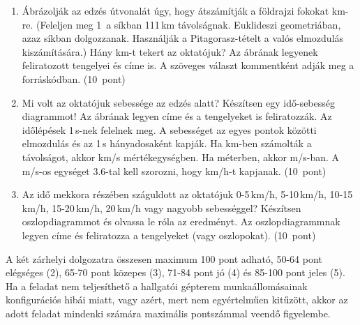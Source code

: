 \documentclass[a4paper,12pt]{letter}
\begin{document}
\begin{enumerate}
\begin{enumerate}
\item Ábrázolják az edzés útvonalát úgy, hogy átszámítják a földrajzi fokokat km-re. (Feleljen meg 1\textdegree\ a síkban 111\,km távolságnak. Euklideszi geometriában, azaz síkban dolgozzanak. Használják a Pitagorasz-tételt a valós elmozdulás kiszámítására.) Hány km-t tekert az oktatójuk? Az ábrának legyenek feliratozott tengelyei és címe is. A szöveges választ kommentként adják meg a forráskódban. \hfill (10~pont)
\item Mi volt az oktatójuk sebessége az edzés alatt? Készítsen egy idő-sebesség diagrammot! Az ábrának legyen címe és a tengelyeket is feliratozzák. Az időlépések 1\,s-nek felelnek meg. A sebességet az egyes pontok közötti elmozdulás és az 1\,s hányadosaként kapják. Ha km-ben számolták a távolságot, akkor km/s mértékegységben. Ha méterben, akkor m/s-ban. A m/s-os egységet 3.6-tal kell szorozni, hogy km/h-t kapjanak. \hfill (10~pont)
  \item Az idő mekkora részében száguldott az oktatójuk 0-5\,km/h, 5-10\,km/h, 10-15\,km/h, 15-20\,km/h, 20\,km/h vagy nagyobb sebességgel? Készítsen oszlopdiagrammot és olvassa le róla az eredményt. Az oszlopdiagrammnak legyen címe és feliratozza a tengelyeket (vagy oszlopokat). \hfill (10~pont)
 \end{enumerate}

 \end{enumerate}

A két zárhelyi dolgozatra összesen maximum 100 pont adható, 50-64 pont elégséges (2), 65-70 pont közepes (3), 71-84 pont jó (4) és 85-100 pont jeles (5). Ha a feladat nem teljesíthető a hallgatói gépterem munkaállomásainak konfigurációs hibái miatt, vagy azért, mert nem egyértelműen kitűzött, akkor az adott feladat mindenki számára maximális pontszámmal veendő figyelembe.

\bigskip


\vfill
\end{document}
